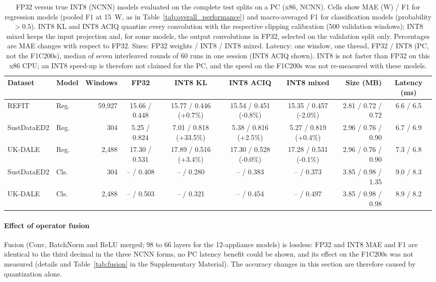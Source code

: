 \documentclass[fleqn,10pt]{wlscirep}
\begin{document}
\begin{table}[!t]
\centering
\caption{FP32 versus true INT8 (NCNN) models evaluated on the complete test splits on a PC (x86, NCNN). Cells show MAE (W) / F1 for regression models (pooled F1 at 15~W, as in Table~\ref{tab:overall_performance}) and macro-averaged F1 for classification models (probability $>0.5$). INT8 KL and INT8 ACIQ quantize every convolution with the respective clipping calibration (500 validation windows); INT8 mixed keeps the input projection and, for some models, the output convolutions in FP32, selected on the validation split only. Percentages are MAE changes with respect to FP32. Sizes: FP32 weights / INT8 / INT8 mixed. Latency: one window, one thread, FP32 / INT8 (PC, not the F1C200s), median of seven interleaved rounds of 60 runs in one session (INT8 ACIQ shown). INT8 is not faster than FP32 on this x86 CPU; an INT8 speed-up is therefore not claimed for the PC, and the speed on the F1C200s was not re-measured with these models.}
\label{tab:int8_pc}
\footnotesize
\begin{adjustbox}{max width=\textwidth}\begin{tabular}{@{}llrccccrc@{}}
\toprule
Dataset & Model & Windows & FP32 & INT8 KL & INT8 ACIQ & INT8 mixed & Size (MB) & Latency (ms) \\
\midrule
REFIT & Reg. & 59,927 & 15.66 / 0.448 & 15.77 / 0.446 (+0.7\%) & 15.54 / 0.451 (-0.8\%) & 15.35 / 0.457 (-2.0\%) & 2.81 / 0.72 / 0.72 & 6.6 / 6.5 \\
SustDataED2 & Reg. & 304 & 5.25 / 0.824 & 7.01 / 0.818 (+33.5\%) & 5.38 / 0.816 (+2.5\%) & 5.27 / 0.819 (+0.4\%) & 2.96 / 0.76 / 0.90 & 6.7 / 6.9 \\
UK-DALE & Reg. & 2,488 & 17.30 / 0.531 & 17.89 / 0.516 (+3.4\%) & 17.30 / 0.528 (-0.0\%) & 17.28 / 0.531 (-0.1\%) & 2.96 / 0.76 / 0.90 & 7.3 / 6.8 \\
SustDataED2 & Cls. & 304 & -- / 0.408 & -- / 0.280 & -- / 0.383 & -- / 0.373 & 3.85 / 0.98 / 1.35 & 9.0 / 8.3 \\
UK-DALE & Cls. & 2,488 & -- / 0.503 & -- / 0.321 & -- / 0.454 & -- / 0.497 & 3.85 / 0.98 / 0.98 & 8.9 / 8.2 \\
\bottomrule
\end{tabular}\end{adjustbox}
\end{table}

\paragraph{Effect of operator fusion}
Fusion (Conv, BatchNorm and ReLU merged; 98 to 66 layers for the 12-appliance models) is lossless: FP32 and INT8 MAE and F1 are identical to the third decimal in the three NCNN forms, no PC latency benefit could be shown, and its effect on the F1C200s was not measured (details and Table~\ref{tab:fusion} in the Supplementary Material). The accuracy changes in this section are therefore caused by quantization alone.
\end{document}
